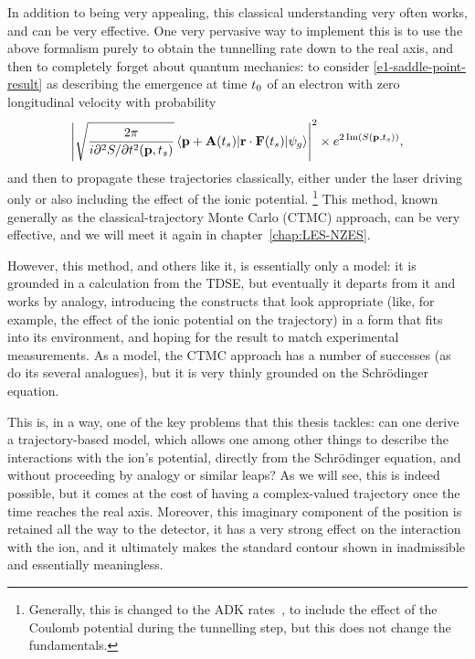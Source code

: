 In addition to being very appealing, this classical understanding very often works, and can be very effective. One very pervasive way to implement this is to use the above formalism purely to obtain the tunnelling rate down to the real axis, and then to completely forget about quantum mechanics: to consider \eqref{e1-saddle-point-result} as describing the emergence at time ${t_0}$ of an electron with zero longitudinal velocity with probability
\begin{equation}
\left|
\sqrt{\frac{2\pi}{i\partial^2 S/\partial t^2(\vbp,\ts)}}
\matrixel{\vbp+\vba(\ts)}{\vbr\cdot\vbf(\ts)}{\psi_g}
\right|^2
\times
e^{2\Im\left(S(\vbp,\ts)\right)} 
,
\end{equation}
and then to propagate these trajectories classically, either under the laser driving only or also including the effect of the ionic potential.%
\footnote{%
Generally, this is changed to the ADK rates~\cite{ammosov-delone-krainov-1986}, to include the effect of the Coulomb potential during the tunnelling step, but this does not change the fundamentals.
}
This method, known generally as the classical-trajectory Monte Carlo (CTMC) approach, can be very effective, and we will meet it again in chapter~\ref{chap:LES-NZES}.

However, this method, and others like it, is essentially only a model: it is grounded in a calculation from the TDSE, but eventually it departs from it and works by analogy, introducing the constructs that look appropriate (like, for example, the effect of the ionic potential on the trajectory) in a form that fits into its environment, and hoping for the result to match experimental measurements. As a model, the CTMC approach has a number of successes (as do its several analogues), but it is very thinly grounded on the Schrödinger equation. 

This is, in a way, one of the key problems that this thesis tackles: can one derive a trajectory-based model, which allows one among other things to describe the interactions with the ion's potential, directly from the Schrödinger equation, and without proceeding by analogy or similar leaps? As we will see, this is indeed possible, but it comes at the cost of having a complex-valued trajectory once the time reaches the real axis. Moreover, this imaginary component of the position is retained all the way to the detector, it has a very strong effect on the interaction with the ion, and it ultimately makes the standard contour shown in  inadmissible and essentially meaningless. 

